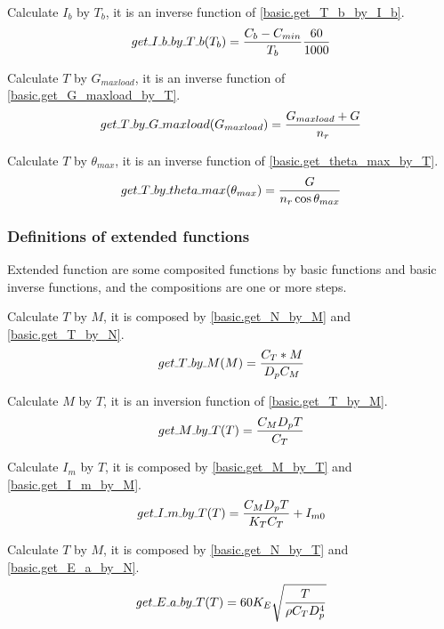 \documentclass{article} %
\numberwithin{equation}{section} %
\newcommand{\SL}{\rule{.3em}{.3pt}} %
\begin{document}
Calculate $I_b$ by $T_b$, it is an inverse function of \eqref{basic.get_T_b_by_I_b}.
\begin{equation}
get\SL I\SL b\SL by\SL T\SL b (T_b) = \frac{C_b - C_{min}}{T_b} \frac{60}{1000} \label{basic.get_I_b_by_T_b}
\end{equation}

Calculate $T$ by $G_{maxload}$, it is an inverse function of \eqref{basic.get_G_maxload_by_T}.
\begin{equation}
get\SL T\SL by\SL G\SL maxload (G_{maxload}) = \frac{G_{maxload} + G}{n_r} \label{basic.get_T_by_G_maxload}
\end{equation}

Calculate $T$ by $\theta_{max}$, it is an inverse function of \eqref{basic.get_theta_max_by_T}.
\begin{equation}
get\SL T\SL by\SL theta\SL max (\theta_{max}) = \frac{G}{n_r \cos{\theta_{max}}} \label{basic.get_T_by_theta_max}
\end{equation}


\subsubsection{Definitions of extended functions}\label{main:basic:extended_functions}
Extended function are some composited functions by basic functions and basic inverse functions, and the compositions are one or more steps.

Calculate $T$ by $M$, it is composed by \eqref{basic.get_N_by_M} and \eqref{basic.get_T_by_N}.
\begin{equation}
get\SL T\SL by\SL M (M) = \frac{C_T * M}{D_p C_M} \label{basic.get_T_by_M}
\end{equation}

Calculate $M$ by $T$, it is an inversion function of \eqref{basic.get_T_by_M}.
\begin{equation}
get\SL M\SL by\SL T (T) = \frac{C_M D_p T}{C_T} \label{basic.get_M_by_T}
\end{equation}

Calculate $I_m$ by $T$, it is composed by \eqref{basic.get_M_by_T} and \eqref{basic.get_I_m_by_M}.
\begin{equation}
get\SL I\SL m\SL by\SL T (T) = \frac{C_M D_p T}{K_T C_T} + I_{m0}  \label{basic.get_I_m_by_T}
\end{equation}

Calculate $T$ by $M$, it is composed by \eqref{basic.get_N_by_T} and \eqref{basic.get_E_a_by_N}.
\begin{equation}
get\SL E\SL a\SL by\SL T (T) = {60} K_E \sqrt{\frac{T}{\rho C_T D_p^4}}  \label{basic.get_E_a_by_T}
\end{equation}
\end{document}
